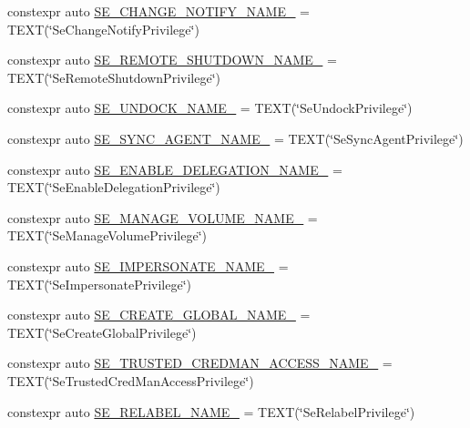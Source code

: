 \begin{DoxyCompactItemize}
\item 
constexpr auto \mbox{\hyperlink{namespaceboost_1_1winapi_a2e0875620298ae82bd13a78ccfde168f}{S\+E\+\_\+\+C\+H\+A\+N\+G\+E\+\_\+\+N\+O\+T\+I\+F\+Y\+\_\+\+N\+A\+M\+E\+\_\+}} = T\+E\+XT(\char`\"{}Se\+Change\+Notify\+Privilege\char`\"{})
\item 
constexpr auto \mbox{\hyperlink{namespaceboost_1_1winapi_a767b78150dc6e2fbfe5d78dc9f1c46cd}{S\+E\+\_\+\+R\+E\+M\+O\+T\+E\+\_\+\+S\+H\+U\+T\+D\+O\+W\+N\+\_\+\+N\+A\+M\+E\+\_\+}} = T\+E\+XT(\char`\"{}Se\+Remote\+Shutdown\+Privilege\char`\"{})
\item 
constexpr auto \mbox{\hyperlink{namespaceboost_1_1winapi_a3953665670c8045805c068852e5ca998}{S\+E\+\_\+\+U\+N\+D\+O\+C\+K\+\_\+\+N\+A\+M\+E\+\_\+}} = T\+E\+XT(\char`\"{}Se\+Undock\+Privilege\char`\"{})
\item 
constexpr auto \mbox{\hyperlink{namespaceboost_1_1winapi_a6cfe2bda14b699274aad9bf64c4d4bc6}{S\+E\+\_\+\+S\+Y\+N\+C\+\_\+\+A\+G\+E\+N\+T\+\_\+\+N\+A\+M\+E\+\_\+}} = T\+E\+XT(\char`\"{}Se\+Sync\+Agent\+Privilege\char`\"{})
\item 
constexpr auto \mbox{\hyperlink{namespaceboost_1_1winapi_a322e9c095674d9de8eb98871c9e016cc}{S\+E\+\_\+\+E\+N\+A\+B\+L\+E\+\_\+\+D\+E\+L\+E\+G\+A\+T\+I\+O\+N\+\_\+\+N\+A\+M\+E\+\_\+}} = T\+E\+XT(\char`\"{}Se\+Enable\+Delegation\+Privilege\char`\"{})
\item 
constexpr auto \mbox{\hyperlink{namespaceboost_1_1winapi_a373ba0c67213053cc59e416ce2b88b3c}{S\+E\+\_\+\+M\+A\+N\+A\+G\+E\+\_\+\+V\+O\+L\+U\+M\+E\+\_\+\+N\+A\+M\+E\+\_\+}} = T\+E\+XT(\char`\"{}Se\+Manage\+Volume\+Privilege\char`\"{})
\item 
constexpr auto \mbox{\hyperlink{namespaceboost_1_1winapi_aef9bc7ae4469ce3ab33233067ea1fd5a}{S\+E\+\_\+\+I\+M\+P\+E\+R\+S\+O\+N\+A\+T\+E\+\_\+\+N\+A\+M\+E\+\_\+}} = T\+E\+XT(\char`\"{}Se\+Impersonate\+Privilege\char`\"{})
\item 
constexpr auto \mbox{\hyperlink{namespaceboost_1_1winapi_a66aeb4ef7086d623c9891dfcbb82bbd9}{S\+E\+\_\+\+C\+R\+E\+A\+T\+E\+\_\+\+G\+L\+O\+B\+A\+L\+\_\+\+N\+A\+M\+E\+\_\+}} = T\+E\+XT(\char`\"{}Se\+Create\+Global\+Privilege\char`\"{})
\item 
constexpr auto \mbox{\hyperlink{namespaceboost_1_1winapi_a2f5b02608b721efadf8d8dc36ca6ee47}{S\+E\+\_\+\+T\+R\+U\+S\+T\+E\+D\+\_\+\+C\+R\+E\+D\+M\+A\+N\+\_\+\+A\+C\+C\+E\+S\+S\+\_\+\+N\+A\+M\+E\+\_\+}} = T\+E\+XT(\char`\"{}Se\+Trusted\+Cred\+Man\+Access\+Privilege\char`\"{})
\item 
constexpr auto \mbox{\hyperlink{namespaceboost_1_1winapi_ac0b494d146c544a2a50663fc0347e25a}{S\+E\+\_\+\+R\+E\+L\+A\+B\+E\+L\+\_\+\+N\+A\+M\+E\+\_\+}} = T\+E\+XT(\char`\"{}Se\+Relabel\+Privilege\char`\"{})

\end{DoxyCompactItemize}
